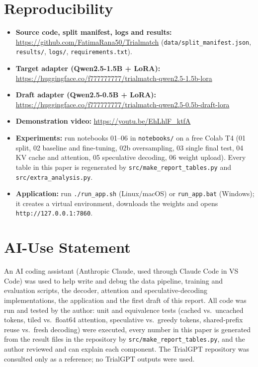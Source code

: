 \documentclass[conference]{IEEEtran}
\begin{document}
\section{Reproducibility}
\begin{itemize}
\item \textbf{Source code, split manifest, logs and results:} \url{https://github.com/FatimaRana50/Trialmatch} (\texttt{data/split\_manifest.json}, \texttt{results/}, \texttt{logs/}, \texttt{requirements.txt}).
\item \textbf{Target adapter (Qwen2.5-1.5B + LoRA):} \url{https://huggingface.co/f777777777/trialmatch-qwen2.5-1.5b-lora}
\item \textbf{Draft adapter (Qwen2.5-0.5B + LoRA):} \url{https://huggingface.co/f777777777/trialmatch-qwen2.5-0.5b-draft-lora}
\item \textbf{Demonstration video:} \url{https://youtu.be/EhLhlF_ktfA}
\item \textbf{Experiments:} run notebooks 01--06 in \texttt{notebooks/} on a free Colab T4 (01 split, 02 baseline and fine-tuning, 02b oversampling, 03 single final test, 04 KV cache and attention, 05 speculative decoding, 06 weight upload). Every table in this paper is regenerated by \texttt{src/make\_report\_tables.py} and \texttt{src/extra\_analysis.py}.
\item \textbf{Application:} run \texttt{./run\_app.sh} (Linux/macOS) or \texttt{run\_app.bat} (Windows); it creates a virtual environment, downloads the weights and opens \texttt{http://127.0.0.1:7860}.
\end{itemize}

\section{AI-Use Statement}
An AI coding assistant (Anthropic Claude, used through Claude Code in VS Code) was used to help write and debug the data pipeline, training and evaluation scripts, the decoder, attention and speculative-decoding implementations, the application and the first draft of this report. All code was run and tested by the author: unit and equivalence tests (cached vs.\ uncached tokens, tiled vs.\ float64 attention, speculative vs.\ greedy tokens, shared-prefix reuse vs.\ fresh decoding) were executed, every number in this paper is generated from the result files in the repository by \texttt{src/make\_report\_tables.py}, and the author reviewed and can explain each component. The TrialGPT repository was consulted only as a reference; no TrialGPT outputs were used.
\end{document}
